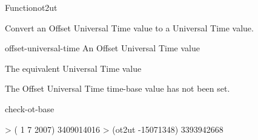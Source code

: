 \documentclass[10pt,twoside,english,pdftex]{article}
\begin{document}
\begin{functiondoc}{Function}{ot2ut}{
  \returns{} }
%

\fnsyntax

\fnpurpose Convert an Offset Universal Time value to a Universal Time 
value.

\fnpackage {}

\fnmodule {}

\fnargs
\begin{args}{offset-universal-time}
 An Offset Universal Time value
\end{args}

\fnreturns The equivalent Universal Time value

\fnerrors The Offset Universal Time time-base value has not been set.

\begin{alsos}{check-ot-base}
\also[*ot-base*]
\also[ut2ot]
\end{alsos}

\fnexample
%
\W\supp
\begin{example}
> ( 1 7 2007)
3409014016
> (ot2ut -15071348)
3393942668
\end{example}

\end{functiondoc}

\end{document}
